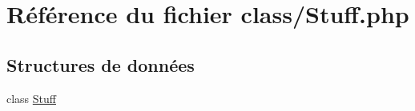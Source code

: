 \hypertarget{class_2_stuff_8php}{}\section{Référence du fichier class/\+Stuff.php}
\label{class_2_stuff_8php}
\subsection*{Structures de données}
\begin{DoxyCompactItemize}
\item 
class \mbox{\hyperlink{class_stuff}{Stuff}}
\end{DoxyCompactItemize}
